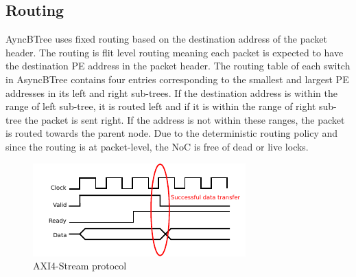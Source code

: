\subsection{Routing}
\label{sec:routing}
AyncBTree uses fixed routing based on the destination address of the packet header.
The routing is flit level routing meaning each packet is expected to have the destination PE address in the packet header.
The routing table of each switch in AsyncBTree contains four entries corresponding to the smallest and largest PE addresses in its left and right sub-trees.
If the destination address is within the range of left sub-tree, it is routed left and if it is within the range of right sub-tree the packet is sent right.
If the address is not within these ranges, the packet is routed towards the parent node.
Due to the deterministic routing policy and since the routing is at packet-level, the NoC is free of dead or live locks.

%

\begin{figure}[t]
\centering
   \includegraphics[width=\columnwidth]{Figures/axi.pdf}
   \caption{AXI4-Stream protocol}
   \label{fig:axi}
\end{figure}


